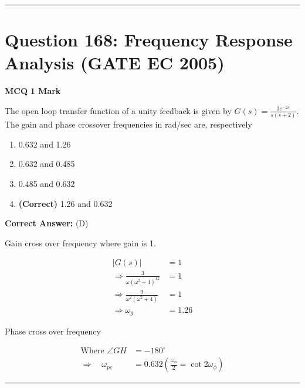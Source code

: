 \documentclass[11pt,a4paper]{article}
\begin{document}
\vspace{1.5em}
\hrule
\vspace{1.5em}

\section*{Question 168: Frequency Response Analysis (GATE EC 2005)}
\noindent \textbf{\color{primary}MCQ} \hfill \textbf{\color{secondary}1 Mark}


\noindent The open loop transfer function of a unity feedback is given by $G(s)=\frac{3e^{-2s}}{s(s+2)}$. 
 The gain and phase crossover frequencies in rad/sec are, respectively


\begin{enumerate}[label=(\Alph*)]
    \item 0.632 and 1.26
    \item 0.632 and 0.485
    \item 0.485 and 0.632
    \item \textbf{(Correct)} 1.26 and 0.632
\end{enumerate}

\noindent \textbf{Correct Answer:} (D)

\begin{tcolorbox}[solbox, title=Detailed Solution -- Question 168]
Gain cross over frequency where gain is 1. 

\[
\begin{aligned} |G(s)| &=1 \\ \Rightarrow \frac{3}{\omega\left(\omega^{2}+4\right)^{12}} &=1 \\ \Rightarrow \frac{9}{\omega^{2}\left(\omega^{2}+4\right)} &=1 \\ \Rightarrow \omega_{g}&=1.26 \end{aligned}
\]

 Phase cross over frequency 

\[
\begin{aligned} \text{Where }\angle G H&=-180^{\circ} \\ \Rightarrow \quad \omega_{p c}&=0.632\left(\frac{\omega_{\phi}}{2}=\cot 2 \omega_{\phi}\right) \end{aligned}
\]
\end{tcolorbox}

\vspace{1.5em}
\hrule
\vspace{1.5em}
\end{document}
